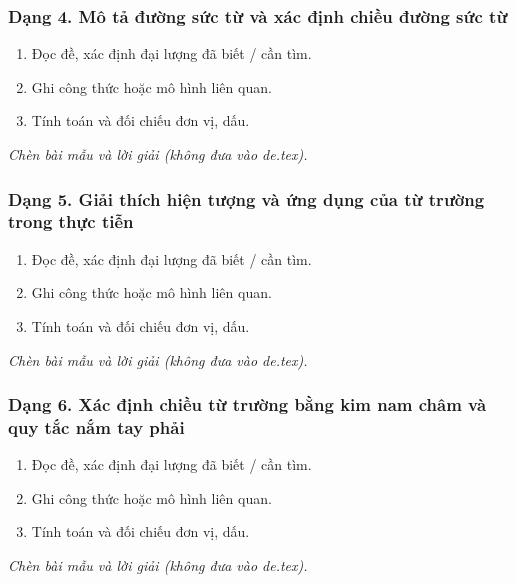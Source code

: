 \subsubsection{Dạng 4. Mô tả đường sức từ và xác định chiều đường sức từ}
\begin{phuongphap}
\begin{enumerate}
\item Đọc đề, xác định đại lượng đã biết / cần tìm.
\item Ghi công thức hoặc mô hình liên quan.
\item Tính toán và đối chiếu đơn vị, dấu.
\end{enumerate}
\end{phuongphap}
\begin{vidumau}
\textit{Chèn bài mẫu và lời giải (không đưa vào de.tex).}
\end{vidumau}

\subsubsection{Dạng 5. Giải thích hiện tượng và ứng dụng của từ trường trong thực tiễn}
\begin{phuongphap}
\begin{enumerate}
\item Đọc đề, xác định đại lượng đã biết / cần tìm.
\item Ghi công thức hoặc mô hình liên quan.
\item Tính toán và đối chiếu đơn vị, dấu.
\end{enumerate}
\end{phuongphap}
\begin{vidumau}
\textit{Chèn bài mẫu và lời giải (không đưa vào de.tex).}
\end{vidumau}

\subsubsection{Dạng 6. Xác định chiều từ trường bằng kim nam châm và quy tắc nắm tay phải}
\begin{phuongphap}
\begin{enumerate}
\item Đọc đề, xác định đại lượng đã biết / cần tìm.
\item Ghi công thức hoặc mô hình liên quan.
\item Tính toán và đối chiếu đơn vị, dấu.
\end{enumerate}
\end{phuongphap}
\begin{vidumau}
\textit{Chèn bài mẫu và lời giải (không đưa vào de.tex).}
\end{vidumau}

